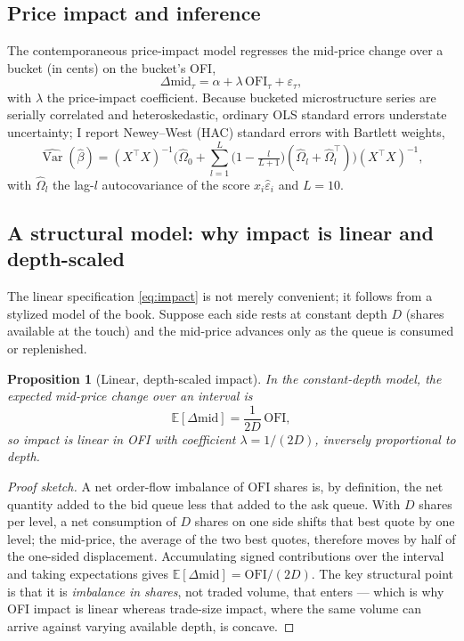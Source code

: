 \documentclass[11pt]{article}
\newtheorem{proposition}{Proposition}
\begin{document}
\subsection{Price impact and inference}
The contemporaneous price-impact model regresses the mid-price change over a
bucket (in cents) on the bucket's OFI,
\begin{equation}
\Delta \mathrm{mid}_\tau = \alpha + \lambda\, \mathrm{OFI}_\tau + \varepsilon_\tau,
\label{eq:impact}
\end{equation}
with $\lambda$ the price-impact coefficient. Because bucketed microstructure
series are serially correlated and heteroskedastic, ordinary OLS standard errors
understate uncertainty; I report Newey--West (HAC) standard errors with Bartlett
weights,
\begin{equation}
\widehat{\operatorname{Var}}(\hat\beta) = (X^\top X)^{-1}
\Big(\hat\Omega_0 + \sum_{l=1}^{L}\big(1-\tfrac{l}{L+1}\big)(\hat\Omega_l + \hat\Omega_l^\top)\Big)
(X^\top X)^{-1},
\end{equation}
with $\hat\Omega_l$ the lag-$l$ autocovariance of the score $x_i \hat\varepsilon_i$
and $L=10$.

\subsection{A structural model: why impact is linear and depth-scaled}
The linear specification \eqref{eq:impact} is not merely convenient; it follows from
a stylized model of the book. Suppose each side rests at constant depth $D$ (shares
available at the touch) and the mid-price advances only as the queue is consumed or
replenished.

\begin{proposition}[Linear, depth-scaled impact]
\label{prop:impact}
In the constant-depth model, the expected mid-price change over an interval is
\[
\mathbb{E}[\Delta \mathrm{mid}] = \frac{1}{2D}\,\mathrm{OFI},
\]
so impact is linear in OFI with coefficient $\lambda = 1/(2D)$, inversely
proportional to depth.
\end{proposition}

\begin{proof}[Proof sketch]
A net order-flow imbalance of $\mathrm{OFI}$ shares is, by definition, the net
quantity added to the bid queue less that added to the ask queue. With $D$ shares
per level, a net consumption of $D$ shares on one side shifts that best quote by one
level; the mid-price, the average of the two best quotes, therefore moves by half of
the one-sided displacement. Accumulating signed contributions over the interval and
taking expectations gives $\mathbb{E}[\Delta\mathrm{mid}] = \mathrm{OFI}/(2D)$. The
key structural point is that it is \emph{imbalance in shares}, not traded volume,
that enters --- which is why OFI impact is linear whereas trade-size impact, where
the same volume can arrive against varying available depth, is concave.
\end{proof}
\end{document}
